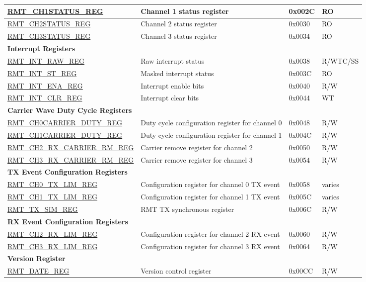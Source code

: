 \begin{longtable}{ | p{5.3cm} | p{7.2cm} | p{1.3cm} | p{1.7cm} | }
\hyperref[regdesc:RMTCHNSTATUSREG]{RMT\_CH1STATUS\_REG} & Channel 1 status register & 0x002C & RO \\ \hline
\hyperref[regdesc:RMTCHMSTATUSREG]{RMT\_CH2STATUS\_REG} & Channel 2 status register & 0x0030 & RO \\ \hline
\hyperref[regdesc:RMTCHMSTATUSREG]{RMT\_CH3STATUS\_REG} & Channel 3 status register & 0x0034 & RO \\ \hline
\multicolumn{4}{|l|}{\textbf{Interrupt Registers}} \\ \hline
\hyperref[regdesc:RMTINTRAWREG]{RMT\_INT\_RAW\_REG} & Raw interrupt status & 0x0038 & R/WTC/SS \\ \hline
\hyperref[regdesc:RMTINTSTREG]{RMT\_INT\_ST\_REG} & Masked interrupt status & 0x003C & RO \\ \hline
\hyperref[regdesc:RMTINTENAREG]{RMT\_INT\_ENA\_REG} & Interrupt enable bits & 0x0040 & R/W \\ \hline
\hyperref[regdesc:RMTINTCLRREG]{RMT\_INT\_CLR\_REG} & Interrupt clear bits & 0x0044 & WT \\ \hline
\multicolumn{4}{|l|}{\textbf{Carrier Wave Duty Cycle Registers}} \\ \hline
\hyperref[regdesc:RMTCHNCARRIERDUTYREG]{RMT\_CH0CARRIER\_DUTY\_REG} & Duty cycle configuration register for channel 0 & 0x0048 & R/W \\ \hline
\hyperref[regdesc:RMTCHNCARRIERDUTYREG]{RMT\_CH1CARRIER\_DUTY\_REG} & Duty cycle configuration register for channel 1 & 0x004C & R/W \\ \hline
\hyperref[regdesc:RMTCHMRXCARRIERRMREG]{RMT\_CH2\_RX\_CARRIER\_RM\_REG} & Carrier remove register for channel 2 & 0x0050 & R/W \\ \hline
\hyperref[regdesc:RMTCHMRXCARRIERRMREG]{RMT\_CH3\_RX\_CARRIER\_RM\_REG} & Carrier remove register for channel 3 & 0x0054 & R/W \\ \hline
\multicolumn{4}{|l|}{\textbf{TX Event Configuration Registers}} \\ \hline
\hyperref[regdesc:RMTCHNTXLIMREG]{RMT\_CH0\_TX\_LIM\_REG} & Configuration register for channel 0 TX event & 0x0058 & varies \\ \hline
\hyperref[regdesc:RMTCHNTXLIMREG]{RMT\_CH1\_TX\_LIM\_REG} & Configuration register for channel 1 TX event & 0x005C & varies \\ \hline
\hyperref[regdesc:RMTTXSIMREG]{RMT\_TX\_SIM\_REG} & RMT TX synchronous register & 0x006C & R/W \\ \hline
\multicolumn{4}{|l|}{\textbf{RX Event Configuration Registers}} \\ \hline
\hyperref[regdesc:RMTCHMRXLIMREG]{RMT\_CH2\_RX\_LIM\_REG} & Configuration register for channel 2 RX event & 0x0060 & R/W \\ \hline
\hyperref[regdesc:RMTCHMRXLIMREG]{RMT\_CH3\_RX\_LIM\_REG} & Configuration register for channel 3 RX event & 0x0064 & R/W \\ \hline
\multicolumn{4}{|l|}{\textbf{Version Register}} \\ \hline
\hyperref[regdesc:RMTDATEREG]{RMT\_DATE\_REG} & Version control register & 0x00CC & R/W \\ \hline
\end{longtable}
